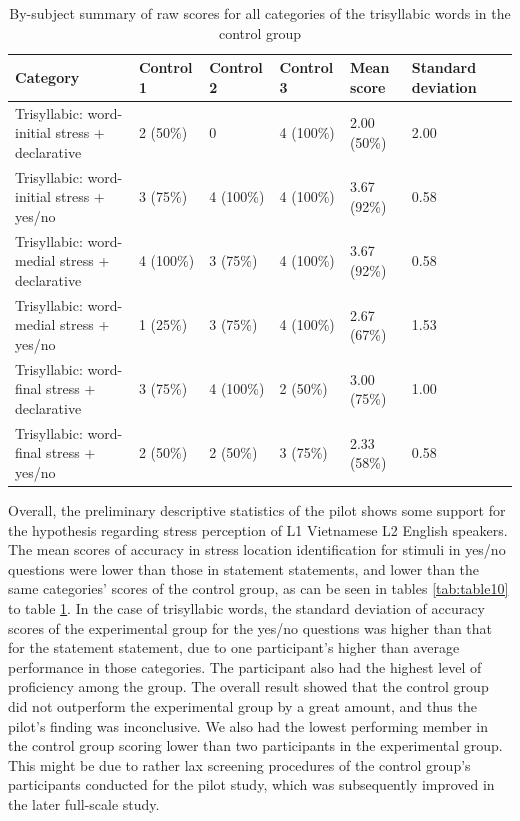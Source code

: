 \documentclass[a4paper]{article}
\begin{document}
\begin{table}[H]
  \begin{center}
    \caption{By-subject summary of raw scores for all categories of the trisyllabic words in the control group}
    \label{tab:table13}
      \begin{tabular}{|p{2cm}|p{2cm}|p{2cm}|p{2cm}|p{2cm}|p{2cm}|p{2cm}}
            \hline
         Category  & Control 1 & Control 2 & Control 3 & Mean score & Standard deviation  \\
         \hline
     Trisyllabic: word-initial stress + declarative & 2 (50\%)  & 0 &   4 (100\%) & 2.00 (50\%) & 2.00 \\
      \hline
     Trisyllabic: word-initial stress + yes/no & 3 (75\%) &  4 (100\%) & 4 (100\%) & 3.67 (92\%) & 0.58 \\
           \hline
     Trisyllabic: word-medial stress + declarative & 4 (100\%) & 3 (75\%) &4 (100\%) & 3.67 (92\%) & 0.58 \\
      \hline
     Trisyllabic: word-medial stress + yes/no & 1 (25\%) &  3 (75\%) &4 (100\%) & 2.67 (67\%) & 1.53\\
           \hline
     Trisyllabic: word-final stress + declarative & 3 (75\%) &4 (100\%) & 2 (50\%) & 3.00 (75\%) & 1.00 \\
      \hline
     Trisyllabic: word-final stress + yes/no & 2 (50\%)  & 2 (50\%) &  3 (75\%) & 2.33 (58\%) & 0.58   \\
     
     \hline
    \end{tabular}
  \end{center}
\end{table}

Overall, the preliminary descriptive statistics of the pilot shows some support for the hypothesis regarding stress perception of L1 Vietnamese L2 English speakers. The mean scores of accuracy in stress location identification for stimuli in yes/no questions were lower than those in statement statements, and lower than the same categories' scores of the control group, as can be seen in tables \ref{tab:table10} to table \ref{tab:table13}. In the case of trisyllabic words, the standard deviation of accuracy scores of the experimental group for the yes/no questions was higher than that for the statement statement, due to one participant's higher than average performance in those categories. The participant also had the highest level of proficiency among the group. The overall result showed that the control group did not outperform the experimental group by a great amount, and thus the pilot's finding was inconclusive. We also had the lowest performing member in the control group scoring lower than two participants in the experimental group. This might be due to rather lax screening procedures of the control group's participants conducted for the pilot study, which was subsequently improved in the later full-scale study.
\end{document}
